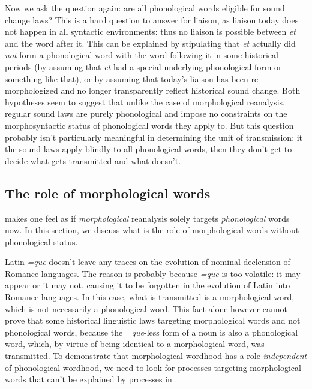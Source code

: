 \documentclass[a4paper, oneside, scheme=plain, 12pt]{article}
\newcommand{\form}[1]{\emph{#1}}
\begin{document}
Now we ask the question again: are all phonological words eligible for sound change laws?
This is a hard question to answer for liaison,
as liaison today does not happen in all syntactic environments:
thus no liaison is possible between \form{et} and the word after it.
This can be explained by stipulating that \form{et} actually did \emph{not} form a phonological word with the word following it
in some historical periods (by assuming that \form{et} had a special underlying phonological form or something like that),
or by assuming that today's liaison has been re-morphologized and no longer transparently reflect historical sound change.
Both hypotheses seem to suggest that unlike the case of morphological reanalysis,
regular sound laws are purely phonological and impose no constraints on the morphosyntactic status of phonological words they apply to.
But this question probably isn't particularly meaningful in determining the unit of transmission:
it the sound laws apply blindly to all phonological words,
then they don't get to decide what gets transmitted and what doesn't.

\subsection{The role of morphological words}

 makes one feel
as if \emph{morphological} reanalysis solely targets \emph{phonological} words now.
In this section, we discuss what is the role of morphological words without phonological status.

Latin \form{=que} doesn't leave any traces on the evolution of nominal declension of Romance languages.
The reason is probably because \form{=que} is too volatile:
it may appear or it may not, causing it to be forgotten in the evolution of Latin into Romance languages.
In this case, what is transmitted is a morphological word,
which is not necessarily a phonological word.
This fact alone however cannot prove that some historical linguistic laws targeting morphological words and not phonological words,
because the \form{=que}-less form of a noun is also a phonological word,
which, by virtue of being identical to a morphological word, was transmitted.
To demonstrate that morphological wordhood has a role \emph{independent} of phonological wordhood,
we need to look for processes targeting morphological words that can't be explained by 
processes in .
\end{document}

